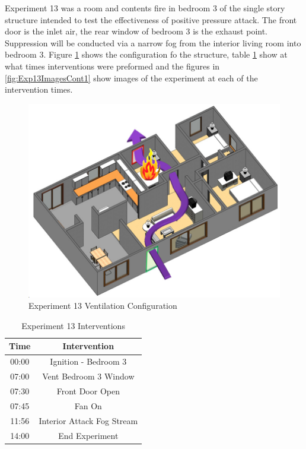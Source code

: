 \documentclass{article}
\begin{document}
Experiment 13 was a room and contents fire in bedroom 3 of the single story structure intended to test the effectiveness of positive pressure attack. The front door is the inlet air, the rear window of bedroom 3 is the exhaust point. Suppression will be conducted via a narrow fog from the interior living room into bedroom 3. Figure \ref{fig:Exp13VentConfig} shows the configuration fo the structure, table \ref{Table:Exp13Interventions} show at what times interventions were preformed and the figures in \ref{fig:Exp13ImagesCont1} show images of the experiment at each of the intervention times.

\begin{figure}[h!]
	\centering
	\includegraphics[width=5in]{0_Images/FireExperiments/Single_Story/Experiment_13.jpg}
	\caption{Experiment 13 Ventilation Configuration}
	\label{fig:Exp13VentConfig}
\end{figure}

\begin{table}[H]
	\centering
	\caption{Experiment 13 Interventions}
	\begin{tabular}{|c|c|} 
		\hline
		Time & Intervention \\ \hline \hline
		00:00 & Ignition - Bedroom 3\\ \hline
		07:00 & Vent Bedroom 3 Window \\ \hline
		07:30 & Front Door Open \\ \hline
		07:45 & Fan On \\ \hline
		11:56 & Interior Attack Fog Stream \\ \hline
		14:00 & End Experiment \\ \hline
	\end{tabular}
	\label{Table:Exp13Interventions}
\end{table}
\end{document}
